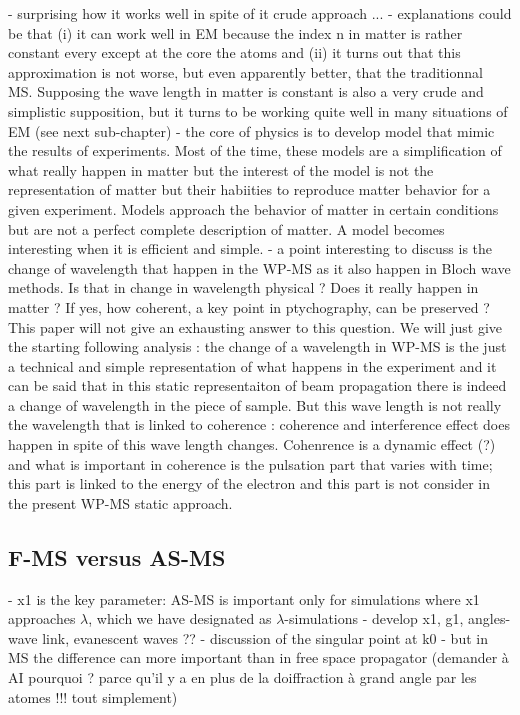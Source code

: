 \documentclass[preprint,12pt,number]{elsarticle}
\begin{document}
- surprising how it works well in spite of it crude approach ... 
- explanations could be that (i) it can work well in EM because the index n in matter is rather constant every except at the core the atoms and (ii) it turns out that this approximation is not worse, but even apparently better, that the traditionnal MS. Supposing the wave length in matter is constant is also a very crude and simplistic supposition, but it turns to be working quite well in many situations of EM (see next sub-chapter)
- the core of physics is to develop model that mimic the results of experiments. Most of the time, these models are a simplification of what really happen in matter but the interest of the model is not the representation of matter but their habiities to reproduce matter behavior for a given experiment. Models approach the behavior of matter in certain conditions but are not a perfect complete description of matter. A model becomes interesting when it is efficient and simple. 
- a point interesting to discuss is the change of wavelength that happen in  the WP-MS as it also happen in Bloch wave methods. Is that in change in wavelength physical ? Does it really happen in matter ? If yes, how coherent, a key point in ptychography, can be preserved ? This paper will not give an exhausting answer to this question. We will just give the starting following analysis : the change of a wavelength in WP-MS is the just a technical and simple representation of what happens in the experiment and it can be said that in this static representaiton of beam propagation there is indeed a change of wavelength in the piece of sample. But this wave length is not really the wavelength that is linked to coherence : coherence and interference effect does happen in spite of this wave length changes. Cohenrence is a dynamic effect (?) and what is important in coherence is the pulsation part that varies with time; this part is linked to the energy of the electron and this part is not consider in the present WP-MS static approach. 

\subsection{F-MS versus AS-MS }
\label{sec:F-MSversusAS-MS }
- x1 is the key parameter: AS-MS is important only for simulations where x1 approaches $\lambda$, which we have designated as $\lambda$-simulations
- develop x1, g1, angles-wave link, evanescent waves ??
- discussion of the singular point at k0  
- but in MS the difference can more important than in free space propagator (demander à AI pourquoi ?  parce qu’il y a en plus de la doiffraction à grand angle par les atomes !!! tout simplement) 
  
\end{document}
